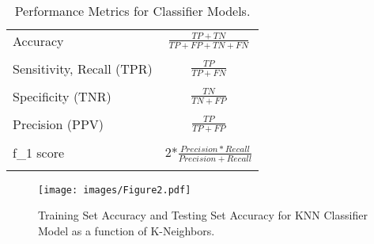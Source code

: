 \documentclass[sigconf]{acmart}
\begin{document}

\begin{table}
  \caption{Performance Metrics for Classifier Models.}
  \label{tab:freq}
  \begin{tabular}{lc}
    \toprule
    Accuracy & \(\frac{TP+TN}{TP+FP+TN+FN}\) \\
    & \\
    Sensitivity, Recall (TPR) &  \(\frac{TP}{TP+FN}\) \\
    & \\
    Specificity (TNR) &  \(\frac{TN}{TN+FP}\) \\
    & \\
    Precision (PPV) & \(\frac{TP}{TP+FP}\)  \\
    & \\
    f_1 score & 2*\(\frac{Precision*Recall}{Precision+Recall}\) \\
    & \\
    \bottomrule
  \end{tabular}
\end{table}


\begin{figure}[!ht]
  \centering\texttt{[image: images/Figure2.pdf]}
  \caption{Training Set Accuracy and Testing Set Accuracy for KNN Classifier
  Model as a function of K-Neighbors.}
  \label{f:Figure2}
\end{figure}

\end{document}
